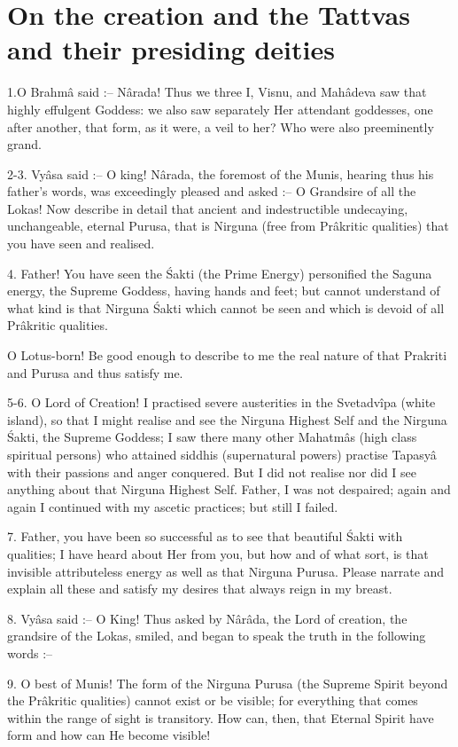 ﻿\chapter{On the creation and the Tattvas and their presiding deities}

1.O Brahm\^a said :-- N\^arada! Thus we three I, Visnu, and Mah\^adeva saw that highly effulgent Goddess: we also saw separately Her attendant goddesses, one after another, that form, as it were, a veil to her? Who were also preeminently grand.

2-3. Vy\^asa said :-- O king! N\^arada, the foremost of the Munis, hearing thus his father's words, was exceedingly pleased and asked :-- O Grandsire of all the Lokas! Now describe in detail that ancient and indestructible undecaying, unchangeable, eternal Purusa, that is Nirguna (free from Pr\^akritic qualities) that you have seen and realised.

4. Father! You have seen the \'Sakti (the Prime Energy) personified the Saguna energy, the Supreme Goddess, having hands and feet; but cannot understand of what kind is that Nirguna \'Sakti which cannot be seen and which is devoid of all Pr\^akritic qualities.

O Lotus-born! Be good enough to describe to me the real nature of that Prakriti and Purusa and thus satisfy me.

5-6. O Lord of Creation! I practised severe austerities in the Svetadv\^ipa (white island), so that I might realise and see the Nirguna Highest Self and the Nirguna \'Sakti, the Supreme Goddess; I saw there many other Mahatm\^as (high class spiritual persons) who attained siddhis (supernatural powers) practise Tapasy\^a with their passions and anger conquered. But I did not realise nor did I see anything about that Nirguna Highest Self. Father, I was not despaired; again and again I continued with my ascetic practices; but still I failed.

7. Father, you have been so successful as to see that beautiful \'Sakti with qualities; I have heard about Her from you, but how and of what sort, is that invisible attributeless energy as well as that Nirguna Purusa. Please narrate and explain all these and satisfy my desires that always reign in my breast.

8. Vy\^asa said :-- O King! Thus asked by N\^ar\^ada, the Lord of creation, the grandsire of the Lokas, smiled, and began to speak the truth in the following words :--

9. O best of Munis! The form of the Nirguna Purusa (the Supreme Spirit beyond the Pr\^akritic qualities) cannot exist or be visible; for everything that comes within the range of sight is transitory. How can, then, that Eternal Spirit have form and how can He become visible!

